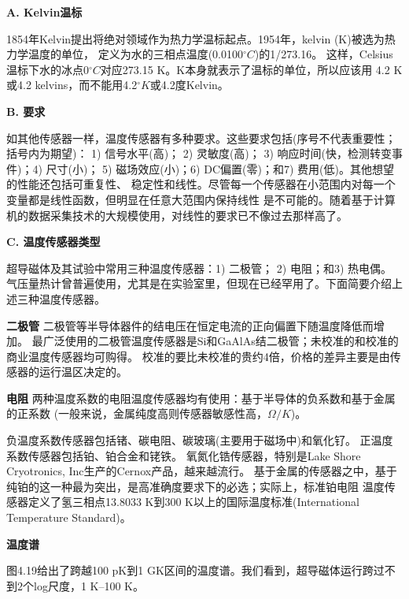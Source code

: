 \textbf{A. Kelvin温标}

1854年Kelvin提出将绝对领域作为热力学温标起点。1954年，kelvin (K)被选为热力学温度的单位，
定义为水的三相点温度(0.0100$^\circ C$)的1/273.16。
这样，Celsius温标下水的冰点0$^\circ C$对应273.15 K。K本身就表示了温标的单位，所以应该用
4.2 K或4.2 kelvins，而不能用4.2$^\circ K$或4.2度Kelvin。

\textbf{B. 要求}

如其他传感器一样，温度传感器有多种要求。这些要求包括(序号不代表重要性；括号内为期望)：
1) 信号水平(高)； 2) 灵敏度(高)； 3) 响应时间(快，检测转变事件)；4) 尺寸(小)；
5) 磁场效应(小)；6) DC偏置(零)；和7) 费用(低)。其他想望的性能还包括可重复性、
稳定性和线性。尽管每一个传感器在小范围内对每一个变量都是线性函数，但明显在任意大范围内保持线性
是不可能的。随着基于计算机的数据采集技术的大规模使用，对线性的要求已不像过去那样高了。

\textbf{C. 温度传感器类型}

超导磁体及其试验中常用三种温度传感器：1) 二极管； 2) 电阻；和3) 热电偶。
气压量热计曾普遍使用，尤其是在实验室里，但现在已经罕用了。下面简要介绍上述三种温度传感器。

\textbf{二极管} 二极管等半导体器件的结电压在恒定电流的正向偏置下随温度降低而增加。
最广泛使用的二极管温度传感器是Si和GaAlAs结二极管；未校准的和校准的商业温度传感器均可购得。
校准的要比未校准的贵约4倍，价格的差异主要是由传感器的运行温区决定的。

\textbf{电阻} 两种温度系数的电阻温度传感器均有使用：基于半导体的负系数和基于金属的正系数
(一般来说，金属纯度高则传感器敏感性高，$\Omega/K$)。

负温度系数传感器包括锗、碳电阻、碳玻璃(主要用于磁场中)和氧化钌。
正温度系数传感器包括铂、铂合金和铑铁。
氧氮化锆传感器，特别是Lake Shore Cryotronics, Inc生产的Cernox产品，越来越流行。
基于金属的传感器之中，基于纯铂的这一种最为突出，是高准确度要求下的必选；实际上，标准铂电阻
温度传感器定义了氢三相点13.8033 K到300 K以上的国际温度标准(International Temperature Standard)。

\textbf{温度谱}

图4.19给出了跨越100 pK到1 GK区间的温度谱。我们看到，超导磁体运行跨过不到2个log尺度，1 K–100 K。


